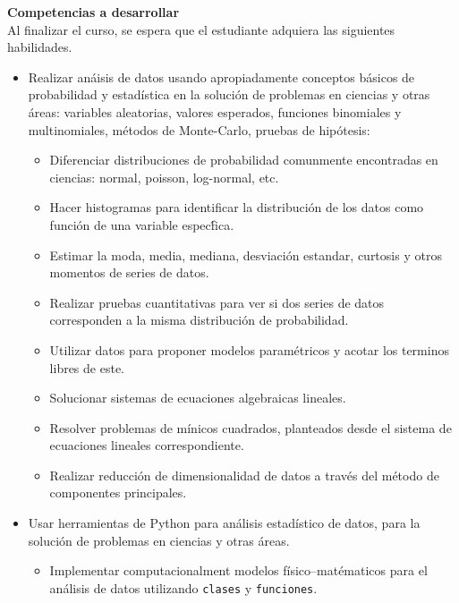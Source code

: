 \documentclass[letterpaper,10pt,onecolumn]{article}
\begin{document}
\noindent\textbf{\large {} \quad Competencias a
  desarrollar}\\[-0.2cm] 


\noindent\normalsize Al finalizar el curso, se espera que el
estudiante adquiera las siguientes habilidades.

\begin{itemize}
\item Realizar an\'aisis de datos usando apropiadamente conceptos b\'asicos de probabilidad y estad\'istica en la soluci\'on de problemas en ciencias y otras \'areas: variables aleatorias, valores esperados, funciones binomiales y multinomiales, m\'etodos de Monte-Carlo, pruebas de hip\'otesis:
 \begin{itemize}
  \item Diferenciar distribuciones de probabilidad comunmente encontradas en ciencias: normal, poisson, log-normal, etc.
  \item Hacer histogramas para identificar la distribuci\'on de los datos como funci\'on de una variable espec\'fica.
  \item Estimar la moda, media, mediana, desviaci\'on estandar, curtosis y otros momentos de series de datos.
  \item Realizar pruebas cuantitativas para ver si dos series de datos corresponden a la misma distribuci\'on de probabilidad.
  \item Utilizar datos para proponer modelos param\'etricos y acotar los terminos libres de este. 
  \item Solucionar sistemas de ecuaciones algebraicas lineales. 
  \item Resolver problemas de m\'inicos cuadrados, planteados desde el sistema de ecuaciones lineales correspondiente.
  \item Realizar reducci\'on de dimensionalidad de datos a trav\'es del m\'etodo de componentes principales.
 \end{itemize}
\item Usar herramientas de Python para an\'alisis estad\'istico de datos, para la soluci\'on de problemas en ciencias y otras \'areas.\\[-0.6cm]
\begin{itemize}
   \item Implementar computacionalment modelos f\'isico--mat\'ematicos para el an\'alisis de datos utilizando \texttt{clases} y \texttt{funciones}.\\[-0.5cm]

\end{itemize}
\end{itemize}
\end{document}
